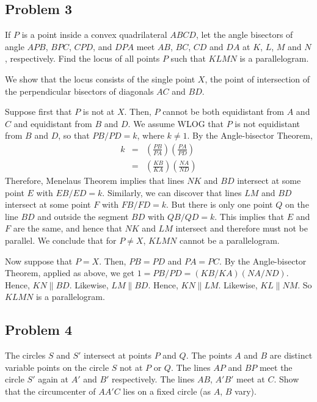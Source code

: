 \subsection{Problem 3}

If $P$ is a point inside a convex quadrilateral $ABCD$, let the angle bisectors of angle $APB$, $BPC$, $CPD$, and $DPA$ meet $AB$, $BC$, $CD$ and $DA$ at $K$, $L$, $M$ and $N$, respectively. Find the locus of all points $P$ such that $KLMN$ is a parallelogram.

\begin{mdsoln}

We show that the locus consists of the single point $X$, the point of intersection of the perpendicular bisectors of diagonals $AC$ and $BD$.

Suppose first that $P$ is not at $X$. Then, $P$ cannot be both equidistant from $A$ and $C$ and equidistant from $B$ and $D$. We assume WLOG that $P$ is not equidistant from $B$ and $D$, so that $PB/PD=k$, where $k\ne 1$. By the Angle-bisector Theorem,\begin{eqnarray*}k&=&\left(\frac{PB}{PA}\right)\left(\frac{PA}{PD}\right)\\ &=&\left(\frac{KB}{KA}\right)\left(\frac{NA}{ND}\right)\end{eqnarray*}Therefore, Menelaus Theorem implies that lines $NK$ and $BD$ intersect at some point $E$ with $EB/ED=k$. Similarly, we can discover that lines $LM$ and $BD$ intersect at some point $F$ with $FB/FD=k$. But there is only one point $Q$ on the line $BD$ and outside the segment $BD$ with $QB/QD=k$. This implies that $E$ and $F$ are the same, and hence that $NK$ and $LM$ intersect and therefore must not be parallel. We conclude that for $P\ne X$, $KLMN$ cannot be a parallelogram.

Now suppose that $P=X$. Then, $PB=PD$ and $PA=PC$. By the Angle-bisector Theorem, applied as above, we get $1=PB/PD=(KB/KA)(NA/ND)$. Hence, $KN\parallel BD$. Likewise, $LM\parallel BD$. Hence, $KN\parallel LM$. Likewise, $KL\parallel NM$. So $KLMN$ is a parallelogram.


\end{mdsoln}

\subsection{Problem 4}

The circles $S$ and $S'$ intersect at points $P$ and $Q$. The points $A$ and $B$ are distinct variable points on the circle $S$ not at $P$ or $Q$. The lines $AP$ and $BP$ meet the circle $S'$ again at $A'$ and $B'$ respectively. The lines $AB$, $A'B'$ meet at $C$. Show that the circumcenter of $AA'C$ lies on a fixed circle (as $A$, $B$ vary).

